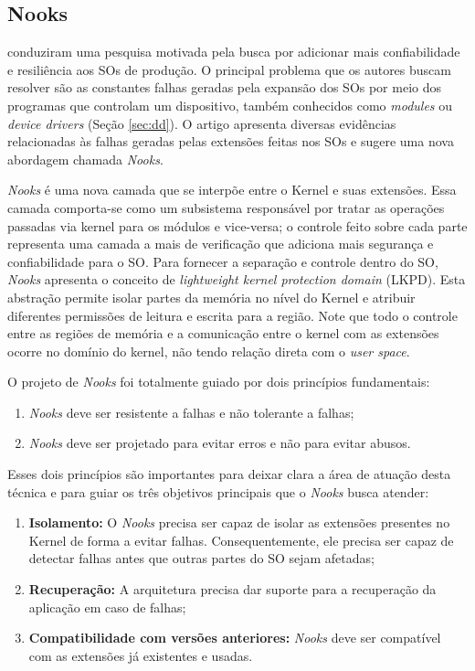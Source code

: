 \subsection{Nooks}
\citet{nooks} conduziram uma pesquisa motivada pela busca por
adicionar mais confiabilidade e resiliência aos SOs de produção. O principal
problema que os autores buscam resolver são as constantes falhas geradas pela
expansão dos SOs por meio dos programas que controlam um dispositivo, também
conhecidos como \emph{modules} ou \emph{device drivers} (Seção \ref{sec:dd}). O
artigo apresenta diversas evidências relacionadas às falhas geradas
pelas extensões feitas nos SOs e sugere uma nova abordagem chamada
\emph{Nooks}.

\emph{Nooks} é uma nova camada que se interpõe entre o Kernel e suas extensões.
Essa camada comporta-se como um subsistema responsável por tratar as operações
passadas via kernel para os módulos e vice-versa; o controle feito sobre cada
parte representa uma camada a mais de verificação que adiciona mais segurança e
confiabilidade para o SO. Para fornecer a separação e controle dentro do SO,
\emph{Nooks} apresenta o conceito de \emph{lightweight kernel protection
domain} (LKPD). Esta abstração permite isolar partes da memória no nível do
Kernel e atribuir diferentes permissões de leitura e escrita para a região.
Note que todo o controle entre as regiões de memória e a comunicação entre o
kernel com as extensões ocorre no domínio do kernel, não tendo relação direta
com o \emph{user space}.

O projeto de \emph{Nooks} foi totalmente guiado por dois princípios
fundamentais:

\begin{enumerate}
	\item \emph{Nooks} deve ser resistente a falhas e não tolerante a falhas;
	\item \emph{Nooks} deve ser projetado para evitar erros e não para evitar
				abusos.
\end{enumerate}

Esses dois princípios são importantes para deixar clara a área de atuação desta
técnica e para guiar os três objetivos principais que o \emph{Nooks} busca
atender:

\begin{enumerate}
	\item \textbf{Isolamento:} O \emph{Nooks} precisa ser capaz de isolar as
				extensões presentes no Kernel de forma a evitar falhas. Consequentemente,
				ele precisa ser capaz de detectar falhas antes que outras partes do
				SO sejam afetadas;
	\item \textbf{Recuperação:} A arquitetura precisa dar suporte para a
				recuperação da aplicação em caso de falhas;
	\item \textbf{Compatibilidade com versões anteriores:} \emph{Nooks} deve ser
				compatível com as extensões já existentes e usadas.
\end{enumerate}

